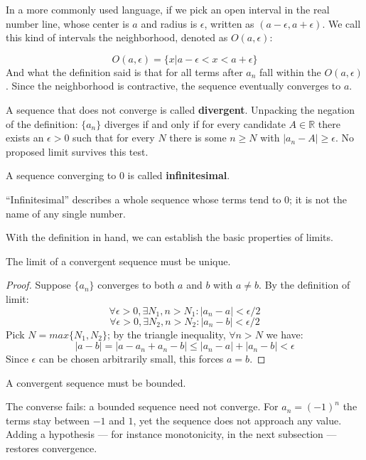 In a more commonly used language, if we pick an open interval in the real number line, whose center is $a$ and radius is $\epsilon$, written as $(a-\epsilon,a+\epsilon)$. We call this kind of intervals the neighborhood, denoted as $O(a,\epsilon)$:

\[O(a,\epsilon)=\{x|a-\epsilon < x < a+\epsilon\}\]
And what the definition said is that for all terms after $a_n$ fall within the $O(a,\epsilon)$. Since the neighborhood is contractive, the sequence eventually converges to $a$.

A sequence that does not converge is called \textbf{divergent}. Unpacking the negation of the definition: $\{a_n\}$ diverges if and only if for every candidate $A \in \mathbb{R}$ there exists an $\epsilon > 0$ such that for every $N$ there is some $n \ge N$ with $|a_n - A| \ge \epsilon$. No proposed limit survives this test.

A sequence converging to $0$ is called \textbf{infinitesimal}.

\begin{remark}
``Infinitesimal'' describes a whole sequence whose terms tend to $0$; it is not the name of any single number.
\end{remark}

With the definition in hand, we can establish the basic properties of limits.

\begin{theorem}
The limit of a convergent sequence must be unique.
\end{theorem}
\begin{proof}
Suppose $\{a_n\}$ converges to both $a$ and $b$ with $a \neq b$. By the definition of limit:
\[
\forall\epsilon>0, \exists N_1, n>N_1:|a_n - a|< \epsilon/2
\]
\[
\forall\epsilon>0, \exists N_2, n>N_2:|a_n - b|< \epsilon/2
\]
Pick $N=max\{N_1,N_2\}$; by the triangle inequality, $\forall n>N$ we have:
\[
|a-b| = |a-a_n+a_n-b| \leq |a_n-a|+|a_n-b|<\epsilon
\]
Since $\epsilon$ can be chosen arbitrarily small, this forces $a=b$.
\end{proof}

\begin{theorem}
A convergent sequence must be bounded.
\end{theorem}
\begin{remark}
The converse fails: a bounded sequence need not converge. For $a_n = (-1)^n$ the terms stay between $-1$ and $1$, yet the sequence does not approach any value. Adding a hypothesis — for instance monotonicity, in the next subsection — restores convergence.
\end{remark}

